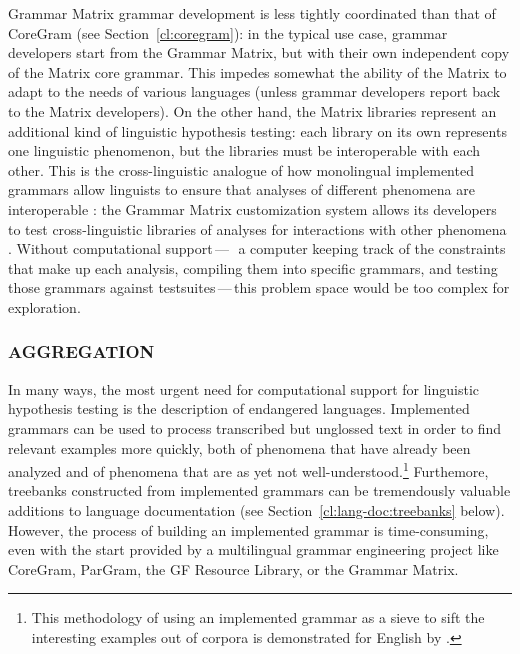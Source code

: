 \documentclass[output=paper,nonflat]{langsci/langscibook}
\begin{document}
Grammar Matrix grammar development is less tightly coordinated than
that of CoreGram (see Section~\ref{cl:coregram}): in the typical use case,
grammar developers start from the Grammar Matrix, but with their own
independent copy of the Matrix core grammar. This impedes somewhat the
ability of the Matrix to adapt to the needs of various languages
(unless grammar developers report back to the Matrix developers).  On
the other hand, the Matrix libraries represent an additional kind of
linguistic hypothesis testing: each library on its own represents one
linguistic phenomenon, but the libraries must be interoperable with
each other. This is the cross-linguistic analogue of how monolingual
implemented grammars allow linguists to ensure that analyses of
different phenomena are interoperable
\citep{Mueller99a,Bender2008c-Short}: the Grammar Matrix customization
system allows its developers to test cross-linguistic libraries of
analyses for interactions with other phenomena
\citep{BFO2011a-u,Bender:16}. Without computational
support\,---\,\ie\ a computer keeping track of the constraints that
make up each analysis, compiling them into specific grammars, and
testing those grammars against testsuites\,---\,this problem space
would be too complex for exploration.

\subsubsection{AGGREGATION}
\label{cl:lang-doc:aggr}

In many ways, the most urgent need for computational support for
linguistic hypothesis testing is the description of endangered
languages. Implemented grammars can be used to process transcribed but
unglossed text in order to find relevant examples more quickly, both
of phenomena that have already been analyzed and of phenomena that are
as yet not well-understood.\footnote{This methodology of using an
  implemented grammar as a sieve to sift the interesting examples out
  of corpora is demonstrated for English by \cite{Baldwin-et-al-05}.}
Furthemore, treebanks constructed from implemented grammars can be
tremendously valuable additions to language documentation (see
Section~\ref{cl:lang-doc:treebanks} below). However, the process of building an
implemented grammar is time-consuming, even with the start provided by
a multilingual grammar engineering project like CoreGram, ParGram, the GF Resource Library, or the
Grammar Matrix.
\end{document}
